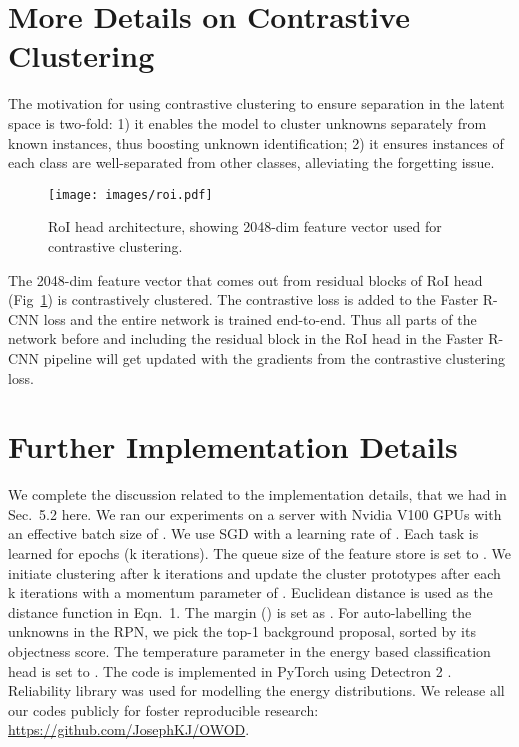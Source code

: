 \documentclass[final]{cvpr}
\begin{document}
\section{More Details on Contrastive Clustering}
The motivation for using contrastive clustering to ensure separation in the latent space 
is two-fold: 1) it enables the model to cluster unknowns separately from known instances, thus boosting unknown identification; 2) it ensures instances of each class are well-separated from other classes, alleviating the forgetting issue.
\begin{figure}[h]
\texttt{[image: images/roi.pdf]}
\vspace{-10pt}
\caption{RoI head architecture, showing 2048-dim feature vector used for contrastive clustering.}
\vspace{-5pt}
\label{fig:contrastive_clustering}
\end{figure} 

The 2048-dim feature vector that comes out from residual blocks of RoI head (Fig~\ref{fig:contrastive_clustering}) is contrastively clustered. The contrastive loss is added to the Faster R-CNN loss and the entire network is trained end-to-end. Thus all parts of the network before and including the residual block in the RoI head in the Faster R-CNN pipeline will get updated with the gradients from the contrastive clustering loss. 

\section{Further Implementation Details} 
We complete the discussion related to the implementation details, that we had in Sec.~5.2 here. 
We ran our experiments on a server with  Nvidia V100 GPUs with an effective batch size of . We use SGD with a learning rate of . Each task is learned for  epochs (k iterations). The queue size of the feature store is set to . We initiate clustering after k iterations and update the cluster prototypes after each k iterations with a momentum parameter of . Euclidean distance is used as the distance function  in Eqn.~1. The margin ()  is set as . For auto-labelling the unknowns in the RPN, we pick the top-1 background proposal, sorted by its objectness score. The temperature parameter in the energy based classification head is set to . The code is implemented in PyTorch \cite{NEURIPS2019_9015} using Detectron 2 \cite{wu2019detectron2}. Reliability  library \cite{matthew_reid_2020_4255226} was used for modelling the energy distributions.
We release all our codes publicly for foster reproducible research: \small\url{https://github.com/JosephKJ/OWOD}.
\end{document}
